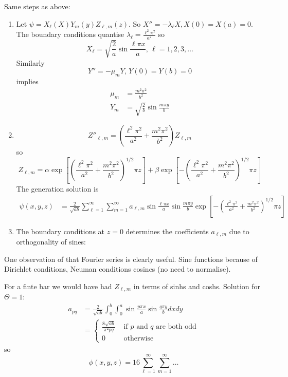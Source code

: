 \documentclass[a4paper]{article}
\begin{document}
Same steps as above:
\begin{enumerate}
\item Let \(\psi = X_\ell(X) Y_m(y) Z_{\ell, m}(z)\). So \(X'' = -\lambda_\ell X, X(0) = X(a) = 0\). The boundary conditions quantise \(\lambda_\ell = \frac{\ell^2\pi^2}{a^2}\) so
  \[
    X_\ell = \sqrt{\frac{2}{a}} \sin \frac{\ell\pi x}{a}, \, \ell = 1, 2, 3, \dots
  \]
  Similarly
  \[
    Y'' = -\mu_m Y, \, Y(0) = Y(b) = 0
  \]
  implies
  \begin{align*}
    \mu_m &= \frac{m^2\pi^2}{b^2} \\
    Y_m &= \sqrt{\frac{2}{b}} \sin \frac{m\pi y}{b}
  \end{align*}
\item
  \[
    Z''_{\ell, m} = \left( \frac{\ell^2\pi^2}{a^2} + \frac{m^2\pi^2}{b^2} \right) Z_{\ell, m}
  \]
  so
  \[
    Z_{\ell, m} = \alpha \exp \left[ \left( \frac{\ell^2\pi^2}{a^2} + \frac{m^2\pi^2}{b^2} \right)^{1/2} \pi z \right] + \beta \exp \left[ -\left( \frac{\ell^2\pi^2}{a^2} + \frac{m^2\pi^2}{b^2} \right)^{1/2} \pi z \right]
  \]
  The generation solution is
  \begin{align*}
    \psi(x, y, z) &= \frac{2}{\sqrt{ab}} \sum_{\ell = 1}^{\infty} \sum_{m = 1}^{\infty} a_{\ell, m} \sin \frac{\ell\pi x}{a} \sin \frac{m\pi y}{b} \exp \left[ -\left( \frac{\ell^2\pi^2}{a^2} + \frac{m^2\pi^2}{b^2} \right)^{1/2} \pi z \right]
  \end{align*}
\item The boundary conditions at \(z = 0\) determines the coefficients \(a_{\ell, m}\) due to orthogonality of sines:
  \iffalse
  \begin{align*}
    & \frac{2}{\sqrt{ab}} \int_{0}^{b} \int_{0}^{a} \Theta(x, y) \sin \frac{p\pi x}{a} \sin \frac{q\pi y}{b} dx dy \\
    =& \sum_{\ell = 1}^{\infty} \sum_{m = 1}^{\infty} a_\ell \frac{2}{b} \int_{0}^{b} \sin \frac{m\pi y}{b} \sin \frac{q\pi y}{b} dx \right] \dots \\
    =& a_{pq}
  \end{align*}
  \fi
\end{enumerate}

One observation of that Fourier series is clearly useful. Sine functions because of Dirichlet  conditions, Neuman conditions cosines (no need to normalise).

For a finte bar we would have had \(Z_{\ell, m}\) in terms of sinhs and coshs. Solution for \(\Theta = 1\):
\begin{align*}
  a_{pq} &= \frac{2}{\sqrt{ab}} \int_{0}^{b} \int_{0}^{a} \sin \frac{p\pi x}{a} \sin \frac{q \pi y}{b} dx dy \\
         &=
           \begin{cases}
             \frac{8 \sqrt{ab}}{\pi^2 pq} & \text{ if \(p\) and \(q\) are both odd} \\
             0 &\text{ otherwise}
           \end{cases}
\end{align*}
so
\[
  \phi(x, y, z) = 16 \sum_{\ell = 1}^{\infty} \sum_{m = 1}^{\infty} \dots
\]
\end{document}
